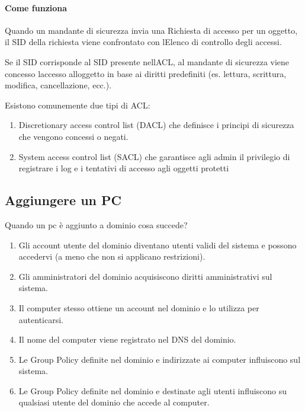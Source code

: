\paragraph{Come funziona}\label{come-funziona}

Quando un mandante di sicurezza invia una Richiesta di accesso per un
oggetto, il SID della richiesta viene confrontato con
l\textquotesingle Elenco di controllo degli accessi.

Se il SID corrisponde al SID presente nell\textquotesingle ACL, al
mandante di sicurezza viene concesso l\textquotesingle accesso
all\textquotesingle oggetto in base ai diritti predefiniti (es. lettura,
scrittura, modifica, cancellazione, ecc.).

Esistono comunemente due tipi di ACL:

\begin{enumerate}
\def\labelenumi{\arabic{enumi}.}
\item
  Discretionary access control list (DACL) che definisce i principi di
  sicurezza che vengono concessi o negati.
\item
  System access control list (SACL) che garantisce agli admin il
  privilegio di registrare i log e i tentativi di accesso agli oggetti
  protetti
\end{enumerate}

\subsection{Aggiungere un PC}\label{aggiungere-un-pc}

Quando un pc è aggiunto a dominio cosa succede?

\begin{enumerate}
\def\labelenumi{\arabic{enumi}.}
\item
  Gli account utente del dominio diventano utenti validi del sistema e
  possono accedervi (a meno che non si applicano restrizioni).
\item
  Gli amministratori del dominio acquisiscono diritti amministrativi sul
  sistema.
\item
  Il computer stesso ottiene un account nel dominio e lo utilizza per
  autenticarsi.
\item
  Il nome del computer viene registrato nel DNS del dominio.
\item
  Le Group Policy definite nel dominio e indirizzate ai computer
  influiscono sul sistema.
\item
  Le Group Policy definite nel dominio e destinate agli utenti
  influiscono su qualsiasi utente del dominio che accede al computer.
\end{enumerate}

